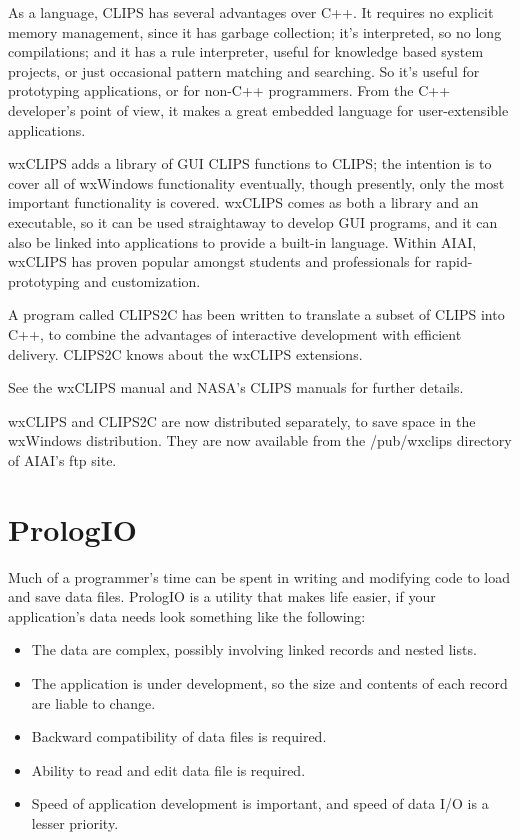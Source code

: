 As a language, CLIPS has several advantages over C++. It requires no
explicit memory management, since it has garbage collection; it's
interpreted, so no long compilations; and it has a rule interpreter,
useful for knowledge based system projects, or just occasional pattern
matching and searching. So it's useful for prototyping applications,
or for non-C++ programmers. From the C++ developer's point of view,
it makes a great embedded language for user-extensible applications.

wxCLIPS adds a library of GUI CLIPS functions to CLIPS; the intention is
to cover all of wxWindows functionality eventually, though presently,
only the most important functionality is covered. wxCLIPS comes as both
a library and an executable, so it can be used straightaway to develop
GUI programs, and it can also be linked into applications to provide a
built-in language. Within AIAI, wxCLIPS has proven popular amongst
students and professionals for rapid-prototyping and customization.

A program called CLIPS2C has been written to translate a subset of CLIPS
into C++, to combine the advantages of interactive development
with efficient delivery. CLIPS2C knows about the wxCLIPS extensions.

See the wxCLIPS manual and NASA's CLIPS manuals for further details.

wxCLIPS and CLIPS2C are now distributed separately, to save
space in the wxWindows distribution. They are now available
from the /pub/wxclips directory of AIAI's ftp site.

\section{PrologIO}\label{prologio}

Much of a programmer's time can be spent in writing and modifying code
to load and save data files. PrologIO is a utility that makes life
easier, if your application's data needs look something like the
following:

\begin{itemize}
\item The data are complex, possibly involving linked records and
nested lists.
\item The application is under development, so the size and contents
of each record are liable to change.
\item Backward compatibility of data files is required.
\item Ability to read and edit data file is required.
\item Speed of application development is important, and speed of
data I/O is a lesser priority.
\end{itemize}

